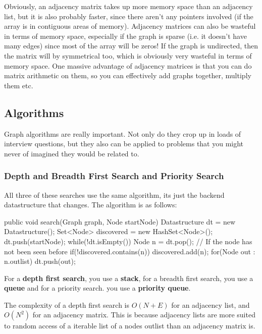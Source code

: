 \begin{description}
    Obviously, an adjacency matrix takes up more memory space than an adjacency
    list, but it is also probably faster, since there aren't any pointers
    involved (if the array is in contiguous areas of memory).
    Adjacency matrices can also be wasteful in terms of memory space, especially
    if the graph is sparse (i.e. it doesn't have many edges) since most of the
    array will be zeros! If the graph is undirected, then the matrix will by
    symmetrical too, which is obviously very wasteful in terms of memory space.
    One massive advantage of adjacency matrices is that you can do matrix
    arithmetic on them, so you can effectively add graphs together, multiply
    them etc.
\end{description}

\subsection{Algorithms}

Graph algorithms are really important. Not only do they crop up in loads of
interview questions, but they also can be applied to problems that you might
never of imagined they would be related to.

\subsubsection{Depth and Breadth First Search and Priority Search}

All three of these searches use the same algorithm, its just the backend
datastructure that changes. The algorithm is as follows:

\begin{javacode}
  public void search(Graph graph, Node startNode) {
    Datastructure dt = new Datastructure();
    Set<Node> discovered = new HashSet<Node>();
    dt.push(startNode);
    while(!dt.isEmpty()) {
      Node n = dt.pop();
      // If the node has not been seen before
      if(!discovered.contains(n)) { 
        discovered.add(n);
        for(Node out : n.outlist) {
          dt.push(out);
        }
      }
    }
  }
\end{javacode}

For a \textbf{depth first search}, you use a \textbf{stack}, for a breadth first
search, you use a \textbf{queue} and for a priority search. you use a
\textbf{priority queue}.

The complexity of a depth first search is $O(N+E)$ for an adjacency list, and
$O(N^2)$ for an adjacency matrix. This is because adjacency lists are more
suited to random access of a iterable list of a nodes outlist than an adjacency
matrix is.

